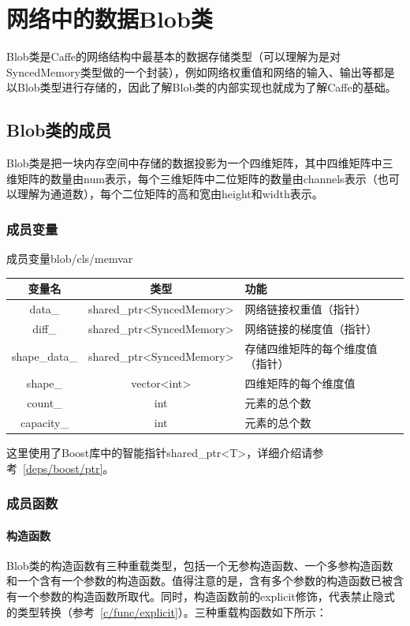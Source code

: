 \chapter{网络中的数据Blob类}
Blob类是Caffe的网络结构中最基本的数据存储类型（可以理解为是对SyncedMemory类型做的一个封装），例如网络权重值和网络的输入、输出等都是以Blob类型进行存储的，因此了解Blob类的内部实现也就成为了解Caffe的基础。
\section{Blob类的成员}
Blob类是把一块内存空间中存储的数据投影为一个四维矩阵，其中四维矩阵中三维矩阵的数量由num表示，每个三维矩阵中二位矩阵的数量由channels表示（也可以理解为通道数），每个二位矩阵的高和宽由height和width表示。
\subsection{成员变量}
\begin{cntable}{成员变量}{blob/cls/memvar}
  \begin{tabular}{|c|c|l|}
    \hline
    变量名 & 类型 & 功能 \\ \hline
    data\_ & shared\_ptr<SyncedMemory> & 网络链接权重值（指针） \\ \hline
    diff\_ & shared\_ptr<SyncedMemory> & 网络链接的梯度值（指针） \\ \hline
    shape\_data\_ & shared\_ptr<SyncedMemory> & 存储四维矩阵的每个维度值（指针） \\ \hline
    shape\_ & vector<int> & 四维矩阵的每个维度值 \\ \hline
    count\_ & int & 元素的总个数 \\ \hline
    capacity\_ & int & 元素的总个数 \\ \hline
  \end{tabular}
\end{cntable}
这里使用了Boost库中的智能指针shared\_ptr<T>，详细介绍请参考~\ref{deps/boost/ptr}。
\subsection{成员函数}
\subsubsection{构造函数}
Blob类的构造函数有三种重载类型，包括一个无参构造函数、一个多参构造函数和一个含有一个参数的构造函数。值得注意的是，含有多个参数的构造函数已被含有一个参数的构造函数所取代。同时，构造函数前的explicit修饰，代表禁止隐式的类型转换（参考~\ref{c/func/explicit}）。三种重载构函数如下所示：

